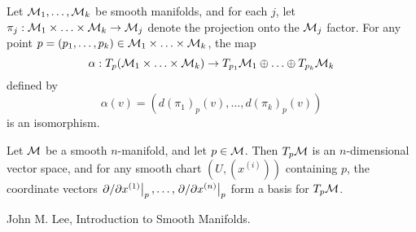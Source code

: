 \documentclass[11pt,a4paper]{article}
\begin{document}
\begin{proposition}
Let $\mathcal{M}_1,\ldots,\mathcal{M}_k$ be smooth manifolds, and for each $j$, let $\pi_j:\mathcal{M}_1\times\ldots\times\mathcal{M}_k\rightarrow \mathcal{M}_j$ denote the projection onto the $\mathcal{M}_j$ factor. For any point $p = (p_1,\ldots,p_k)\in \mathcal{M}_1\times\ldots\times\mathcal{M}_k$, the map 
\begin{equation*}
    \alpha:T_p(\mathcal{M}_1\times\ldots\times\mathcal{M}_k)\rightarrow T_{p_1}\mathcal{M}_1\oplus\ldots\oplus T_{p_k}\mathcal{M}_k
\end{equation*}
defined by 
\begin{equation*}
    \alpha(v) = (d(\pi_1)_p(v),\ldots,d(\pi_k)_p(v))
\end{equation*}
is an isomorphism.
\end{proposition}

\begin{proposition}
Let $\mathcal{M}$ be a smooth $n$-manifold, and let $p\in \mathcal{M}$. Then $T_p\mathcal{M}$ is an $n$-dimensional vector space, and for any smooth chart $(U,(x^{(i)}))$ containing $p$, the coordinate vectors $\left.\partial/\partial x^{(1)}\right|_{p},\ldots,\left.\partial/\partial x^{(n)}\right|_{p}$ form a basis for $T_p\mathcal{M}$.
\end{proposition}



\newpage

\begin{thebibliography}{9}
John M. Lee, Introduction to Smooth Manifolds.



\end{thebibliography}
\end{document}
